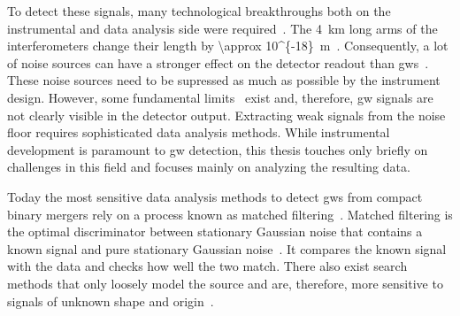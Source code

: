 To detect these signals, many technological breakthroughs both on the instrumental and data analysis side were required~\cite{LIGOScientific:2022aaa, LIGOScientific:2014pky, Allen:2005fk, Buonanno:2000ef, Ajith:2007qp}. The \SI{4}{\kilo\metre} long arms of the interferometers change their length by \SI[parse-numbers=false]{\approx 10^{-18}}{\metre}~\cite{LIGOScientific:2016aoc, LIGOScientific:2022aab}. Consequently, a lot of noise sources can have a stronger effect on the detector readout than \acrshort{gw}s~\cite{LIGOScientific:2014pky}. These noise sources need to be supressed as much as possible by the instrument design. However, some fundamental limits~\cite{Heurs:2018wsu} exist and, therefore, \acrshort{gw} signals are not clearly visible in the detector output. Extracting weak signals from the noise floor requires sophisticated data analysis methods. While instrumental development is paramount to \acrshort{gw} detection, this thesis touches only briefly on challenges in this field and focuses mainly on analyzing the resulting data.

Today the most sensitive data analysis methods to detect \acrshort{gw}s from compact binary mergers rely on a process known as matched filtering~\cite{Wiener:1949aaa, Allen:2005fk}. Matched filtering is the optimal discriminator between stationary Gaussian noise that contains a known signal and pure stationary Gaussian noise~\cite{Allen:2005fk}. It compares the known signal with the data and checks how well the two match. There also exist search methods that only loosely model the source and are, therefore, more sensitive to signals of unknown shape and origin~\cite{ligo_pipelines, Klimenko:2005xv, Klimenko:2015ypf, Lynch:2015yin}.


